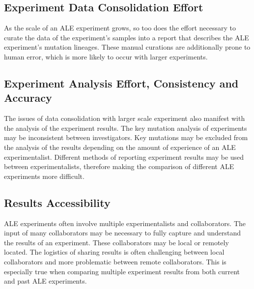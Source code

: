 \documentclass[12pt,final,masters,chapterheads]{ucsd}  %
\begin{document}

\subsection{Experiment Data Consolidation Effort}

As the scale of an ALE experiment grows, so too does the effort necessary to curate the data of the experiment's samples into a report that describes the ALE experiment's mutation lineages. These manual curations are additionally prone to human error, which is more likely to occur with larger experiments.

\subsection{Experiment Analysis Effort, Consistency and Accuracy}

The issues of data consolidation with larger scale experiment also manifest with the analysis of the experiment results. The key mutation analysis of experiments may be inconsistent between investigators. Key mutations may be excluded from the analysis of the results depending on the amount of experience of an ALE experimentalist. Different methods of reporting experiment results may be used between experimentalists, therefore making the comparison of different ALE experiments more difficult.

\subsection{Results Accessibility}

%
%

ALE experiments often involve multiple experimentalists and collaborators. The input of many collaborators may be necessary to fully capture and understand the results of an experiment. These collaborators may be local or remotely located. The logistics of sharing results is often challenging between local collaborators and more problematic between remote collaborators. This is especially true when comparing multiple experiment results from both current and past ALE experiments.
\end{document}
